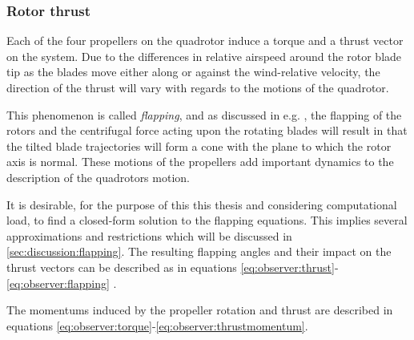 \subsubsection{Rotor thrust}
\label{ssec:observer:thrust}
    Each of the four propellers on the quadrotor induce a torque
    and a thrust vector on the system.
    Due to the differences in relative airspeed around
    the rotor blade tip as the blades move either along or against
    the wind-relative velocity, the direction of the thrust will vary
    with regards to the motions of the quadrotor.

    This phenomenon is called \textit{flapping}, and as discussed
    in e.g. \citep{Pounds_modellingand}, the flapping of the rotors
    and the centrifugal force acting upon the rotating blades
    will result in that the tilted blade trajectories will
    form a cone with the plane to which the rotor axis is normal.
    These motions of the propellers add important dynamics to the
    description of the quadrotors motion.

    It is desirable, for the purpose of this this thesis and
    considering computational load, to find a closed-form
    solution to the flapping equations. This implies several
    approximations and restrictions which will be discussed in
    \ref{sec:discussion:flapping}.
    The resulting flapping angles and their impact on
    the thrust vectors can be described as in equations
    \eqref{eq:observer:thrust}-\eqref{eq:observer:flapping}
    \citep{Pounds_modellingand,prouty1995helicopter,leishman2002principles}.

    The momentums induced by the propeller rotation and thrust
    are described in equations \eqref{eq:observer:torque}-\eqref{eq:observer:thrustmomentum}.

